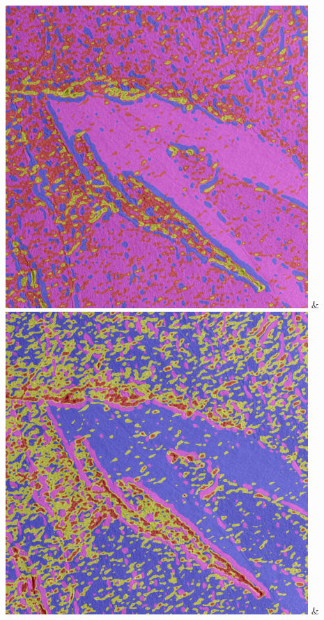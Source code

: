 \begin{table}[h!]
\begin{tabularx}{\textwidth}
		\includegraphics[width=0.9\linewidth]{images/gen/color_weight/p03_03.png_0.33.png} &
		\includegraphics[width=0.9\linewidth]{images/gen/color_weight/p03_03.png_0.66.png} &

\end{tabularx}
\end{table}
